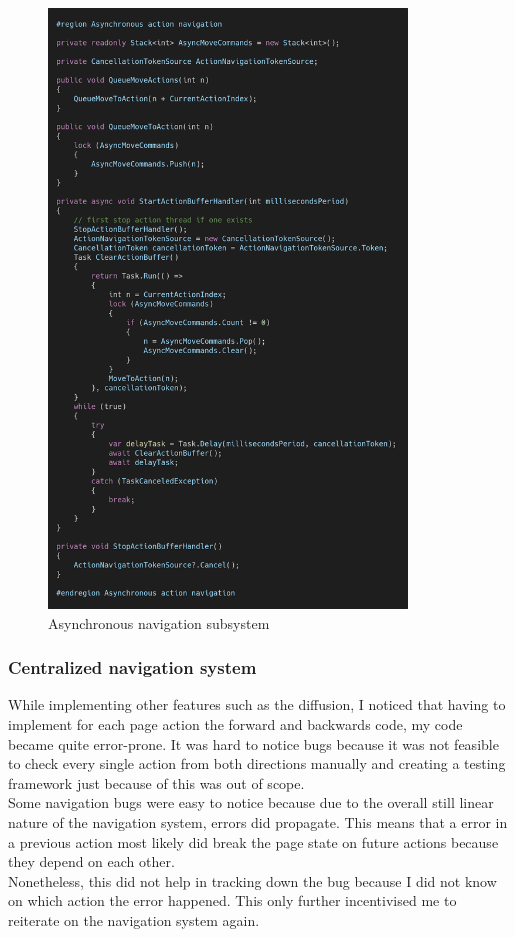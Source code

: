 \begin{figure}
\centering
\includegraphics[width=0.85\textwidth]{figures/code/nav-arch/async-navigation.png}
\caption{Asynchronous navigation subsystem}
\label{fig:async.navigation}
\end{figure}

\FloatBarrier

\subsubsection{Centralized navigation system}

While implementing other features such as the diffusion, I noticed that having to implement for each page action the forward and backwards code, my code became quite error-prone. It was hard to notice bugs because it was not feasible to check every single action from both directions manually and creating a testing framework just because of this was out of scope. \\
Some navigation bugs were easy to notice because due to the overall still linear nature of the navigation system, errors did propagate. This means that a error in a previous action most likely did break the page state on future actions because they depend on each other. \\
Nonetheless, this did not help in tracking down the bug because I did not know on which action the error happened. This only further incentivised me to reiterate on the navigation system again.

